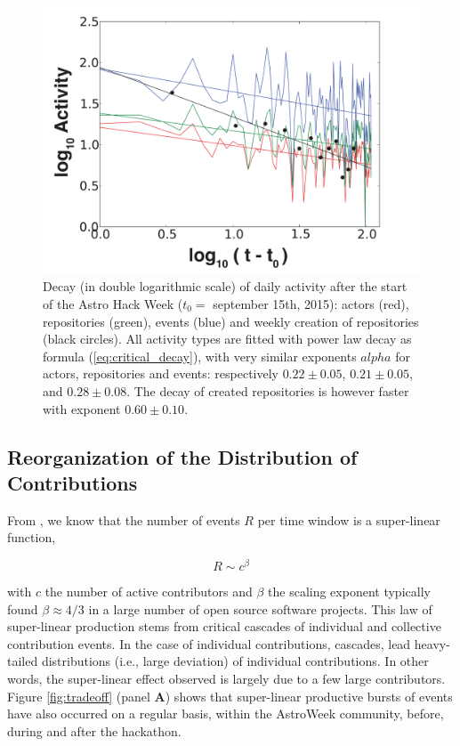 \begin{figure}[!t]
\centering
\includegraphics[width=0.9\columnwidth]{figures/relaxation.eps}
\caption{Decay (in double logarithmic scale) of daily activity after the start of the Astro Hack Week ($t_0 = $ september 15th, 2015): actors (red), repositories (green), events (blue) and weekly creation of repositories (black circles). All activity types are fitted with power law decay as formula (\ref{eq:critical_decay}), with very similar exponents $alpha$ for actors, repositories and events: respectively $0.22\pm0.05$, $0.21\pm0.05$, and $0.28\pm0.08$. The decay of created repositories is however faster with exponent $0.60\pm0.10$.}
\label{fig:relaxation}
\end{figure}


\subsection{Reorganization of the Distribution of Contributions}
From \cite{sornette2014much}, we know that the number of events $R$ per time window is a super-linear function,

\begin{equation}
R \sim c^{\beta}
\label{eq:superlinear}
\end{equation}

with $c$ the number of active contributors and $\beta$ the scaling exponent typically found $\beta \approx 4/3$ in a large number of open source software projects. This law of super-linear production stems from critical cascades of individual and collective contribution events. In the case of individual contributions, cascades, lead heavy-tailed distributions (i.e., large deviation) of individual contributions. In other words, the super-linear effect observed is largely due to a few large contributors. Figure \ref{fig:tradeoff} (panel {\bf A}) shows that super-linear productive bursts of events have also occurred on a regular basis, within the AstroWeek community, before, during and after the hackathon.

